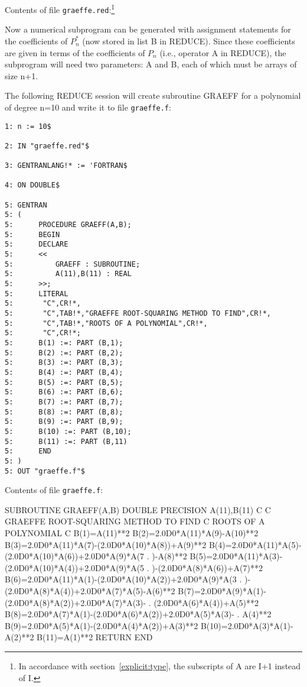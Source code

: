 Contents of file {\tt graeffe.red}:\footnote{
In accordance with section~\ref{explicit:type},
the subscripts of A are I+1 instead of I.}

Now a numerical subprogram can be generated with assignment
statements for the coefficients of $P^{*}_n$ (now stored in list B in
REDUCE).  Since these coefficients are given in terms of the coefficients
of $P_n$ (i.e., operator A in REDUCE), the subprogram will need two
parameters:  A and B, each of which must be arrays of size n+1.

The following REDUCE session will create subroutine GRAEFF for a polynomial
of degree n=10 and write it to file {\tt graeffe.f}:
{\small
\begin{verbatim}
1: n := 10$ 

2: IN "graeffe.red"$

3: GENTRANLANG!* := 'FORTRAN$ 

4: ON DOUBLE$

5: GENTRAN 
5: ( 
5:      PROCEDURE GRAEFF(A,B); 
5:      BEGIN 
5:      DECLARE 
5:      << 
5:          GRAEFF : SUBROUTINE; 
5:          A(11),B(11) : REAL
5:      >>; 
5:      LITERAL 
5:       "C",CR!*, 
5:       "C",TAB!*,"GRAEFFE ROOT-SQUARING METHOD TO FIND",CR!*,
5:       "C",TAB!*,"ROOTS OF A POLYNOMIAL",CR!*, 
5:       "C",CR!*; 
5:      B(1) :=: PART (B,1);
5:      B(2) :=: PART (B,2);
5:      B(3) :=: PART (B,3);
5:      B(4) :=: PART (B,4);
5:      B(5) :=: PART (B,5);
5:      B(6) :=: PART (B,6);
5:      B(7) :=: PART (B,7);
5:      B(8) :=: PART (B,8);
5:      B(9) :=: PART (B,9);
5:      B(10) :=: PART (B,10);
5:      B(11) :=: PART (B,11)
5:      END 
5: ) 
5: OUT "graeffe.f"$ 
\end{verbatim}
}

Contents of file {\tt graeffe.f}:
\begin{framedverbatim}
      SUBROUTINE GRAEFF(A,B)
      DOUBLE PRECISION A(11),B(11)
C
C     GRAEFFE ROOT-SQUARING METHOD TO FIND
C     ROOTS OF A POLYNOMIAL
C
      B(1)=A(11)**2
      B(2)=2.0D0*A(11)*A(9)-A(10)**2
      B(3)=2.0D0*A(11)*A(7)-(2.0D0*A(10)*A(8))+A(9)**2
      B(4)=2.0D0*A(11)*A(5)-(2.0D0*A(10)*A(6))+2.0D0*A(9)*A(7
     . )-A(8)**2
      B(5)=2.0D0*A(11)*A(3)-(2.0D0*A(10)*A(4))+2.0D0*A(9)*A(5
     . )-(2.0D0*A(8)*A(6))+A(7)**2
      B(6)=2.0D0*A(11)*A(1)-(2.0D0*A(10)*A(2))+2.0D0*A(9)*A(3
     . )-(2.0D0*A(8)*A(4))+2.0D0*A(7)*A(5)-A(6)**2
      B(7)=2.0D0*A(9)*A(1)-(2.0D0*A(8)*A(2))+2.0D0*A(7)*A(3)-
     . (2.0D0*A(6)*A(4))+A(5)**2
      B(8)=2.0D0*A(7)*A(1)-(2.0D0*A(6)*A(2))+2.0D0*A(5)*A(3)-
     . A(4)**2
      B(9)=2.0D0*A(5)*A(1)-(2.0D0*A(4)*A(2))+A(3)**2
      B(10)=2.0D0*A(3)*A(1)-A(2)**2
      B(11)=A(1)**2
      RETURN
      END
\end{framedverbatim}

